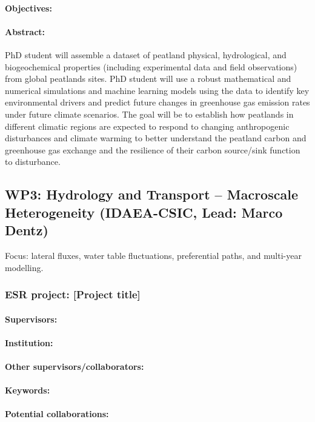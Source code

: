 \documentclass[12pt]{article}
\begin{document}
\paragraph{Objectives:} 
\paragraph{Abstract:} PhD student will assemble a dataset of peatland physical, hydrological, and biogeochemical properties (including experimental data and field observations) from global peatlands sites. PhD student will use a robust mathematical and numerical simulations and machine learning models using the data to identify key environmental drivers and predict future changes in greenhouse gas emission rates under future climate scenarios. The goal will be to establish how peatlands in different climatic regions are expected to respond to changing anthropogenic disturbances and climate warming to better understand the peatland carbon and greenhouse gas exchange and the resilience of their carbon source/sink function to disturbance.

\subsection{WP3: Hydrology and Transport – Macroscale Heterogeneity (IDAEA-CSIC, Lead: Marco Dentz)}

Focus: lateral fluxes, water table fluctuations, preferential paths, and multi-year modelling.

\subsubsection*{ESR project: [Project title]}
\paragraph{Supervisors:} 
\paragraph{Institution:} 
\paragraph{Other supervisors/collaborators:} 
\paragraph{Keywords:} 
\paragraph{Potential collaborations:} 
\end{document}
